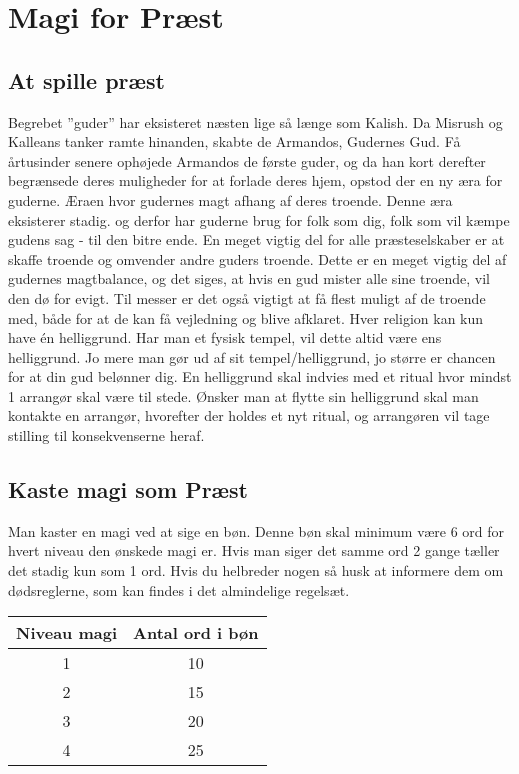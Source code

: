 \chapter*{Magi for Præst}



\section*{At spille præst}
Begrebet ”guder” har eksisteret næsten lige så længe som Kalish. Da Misrush og Kalleans tanker ramte hinanden, skabte de Armandos, Gudernes Gud. Få årtusinder senere ophøjede Armandos de første guder, og da han kort derefter begrænsede deres muligheder for at forlade deres hjem, opstod der en ny æra for guderne. Æraen hvor gudernes magt afhang af deres troende. Denne æra eksisterer stadig. og derfor har guderne brug for folk som dig, folk som vil kæmpe gudens sag - til den bitre ende. En meget vigtig del for alle præsteselskaber er at skaffe troende og omvender andre guders troende. Dette er en meget vigtig del af gudernes magtbalance, og det siges, at hvis en gud mister alle sine troende, vil den dø for evigt. Til messer er det også vigtigt at få flest muligt af de troende med, både for at de kan få vejledning og blive afklaret. Hver religion kan kun have én helliggrund. Har man et fysisk tempel, vil dette altid være ens helliggrund. Jo mere man gør ud af sit tempel/helliggrund, jo større er chancen for at din gud belønner dig. En helliggrund skal indvies med et ritual hvor mindst 1 arrangør skal være til stede. Ønsker man at flytte sin helliggrund skal man kontakte en arrangør, hvorefter der holdes et nyt ritual, og arrangøren vil tage stilling til konsekvenserne heraf.

\section*{Kaste magi som Præst}
Man kaster en magi ved at sige en bøn. Denne bøn skal minimum være 6 ord for hvert niveau den ønskede magi er. Hvis man siger det samme ord 2 gange tæller det stadig kun som 1 ord. Hvis du helbreder nogen så husk at informere dem om dødsreglerne, som kan findes i det almindelige regelsæt.\\
\begin{table}[]
    \centering
    \begin{tabular}{c|c}
        Niveau magi & Antal ord i bøn \\\hline
        1 & 10\\
        2 & 15\\
        3 & 20\\
        4 & 25\\
    \end{tabular}
\end{table}

